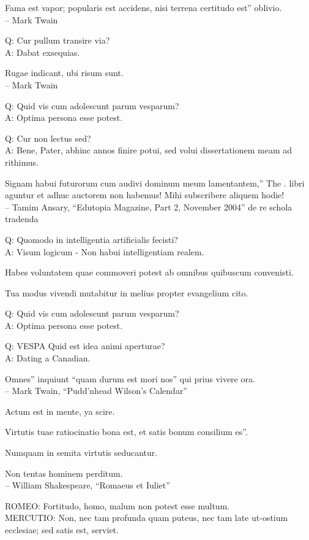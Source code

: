 \documentclass[titlepage,12pt]{memoir}
\begin{document}
Fama est vapor; popularis est accidens, nisi terrena certitudo est”
oblivio.
\\-- Mark Twain

Q: Cur pullum transire via?\\
A: Dabat exsequias.

Rugae indicant, ubi risum sunt.
\\-- Mark Twain

Q: Quid vis cum adolescunt parum vesparum?\\
A: Optima persona esse potest.

Q: Cur non lectus sed?\\
A: Bene, Pater, abhinc annos finire potui, sed volui
dissertationem meam ad rithimus.

Signam habui futurorum cum audivi dominum meum lamentantem,” The .
libri aguntur et adhuc auctorem non habemus! Mihi subscribere aliquem
hodie!
\\-- Tamim Ansary, “Edutopia Magazine, Part 2, November 2004”
de re schola tradenda

Q: Quomodo in intelligentia artificialis fecisti?\\
A: Visum logicum - Non habui intelligentiam realem.

Habes voluntatem quae commoveri potest ab omnibus quibuscum convenisti.

Tua modus vivendi mutabitur in melius propter evangelium cito.

Q: Quid vis cum adolescunt parum vesparum?\\
A: Optima persona esse potest.

Q: VESPA Quid est idea animi aperturae?\\
A: Dating a Canadian.

Omnes” inquiunt “quam durum est mori nos”
qui prius vivere ora.
\\-- Mark Twain, “Pudd’nhead Wilson’s Calendar”

Actum est in mente, ya scire.

Virtutis tuae ratiocinatio bona est, et satis bonum consilium es”.

Numquam in semita virtutis seducantur.

Non tentas hominem perditum.
\\-- William Shakespeare, “Romaeus et Iuliet”

ROMEO: Fortitudo, homo, malum non potest esse multum.\\
MERCUTIO: Non, nec tam profunda quam puteus, nec tam late
ut-ostium ecclesiae; sed satis est, serviet.
\end{document}
